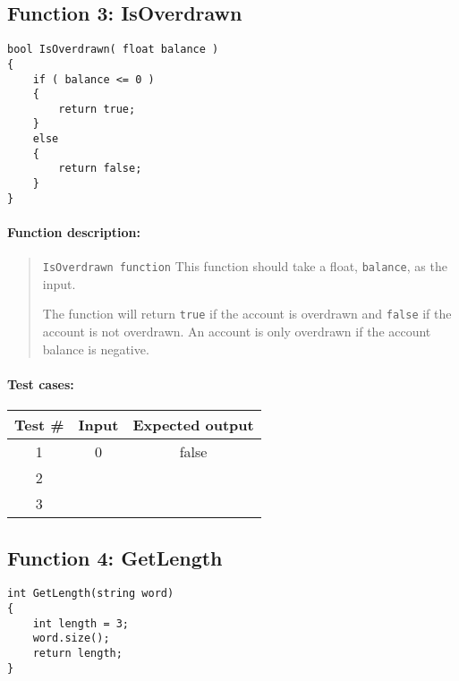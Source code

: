 \subsection{Function 3: IsOverdrawn}

\begin{lstlisting}[style=code]
bool IsOverdrawn( float balance )
{
    if ( balance <= 0 )
    {
        return true;
    }
    else
    {
        return false;
    }
}
\end{lstlisting}

\paragraph{Function description:}

\begin{quote}
    \texttt{IsOverdrawn function}
    This function should take a float, \texttt{balance}, as the input.

    The function will return \texttt{true} if the account is overdrawn
    and \texttt{false} if the account is not overdrawn. An account is only
    overdrawn if the account balance is negative.
\end{quote}

\paragraph{Test cases:}

\begin{center}
    \begin{tabular}{c | c | c}
        \textbf{Test \#} &
        \textbf{Input} &
        \textbf{Expected output}
        \\ \hline
        1 & 0 & false
        \\ \hline
        2 & & \\ \hline
        3 & & \\ \hline
    \end{tabular}
\end{center}

\newpage

\subsection{Function 4: GetLength}

\begin{lstlisting}[style=code]
int GetLength(string word)
{
    int length = 3;
    word.size();
    return length;
}
\end{lstlisting}

